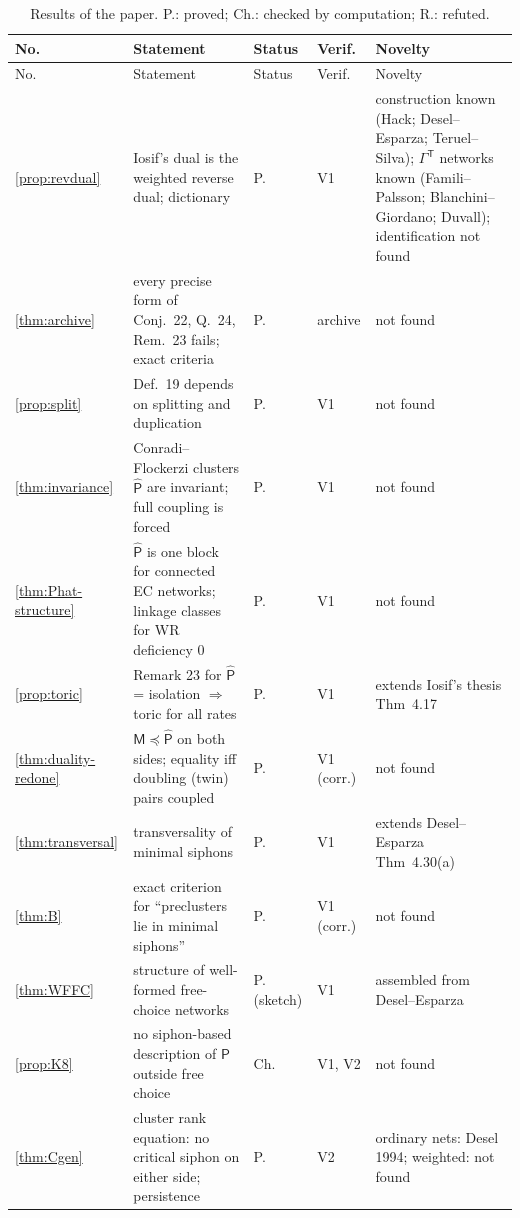 \documentclass[11pt,a4paper]{report}
\newcommand{\Pre}{\mathsf{P}}
\newcommand{\Ph}{\widehat{\mathsf{P}}}
\newcommand{\Mips}{\mathsf{M}}
\newcommand{\refi}{\preceq}
\newcommand{\tp}{^{\mathsf T}}
\begin{document}
{\small
\def\LTcaptype{table}
\setlength{\LTpre}{4pt}
\begin{longtable}{>{\raggedright\arraybackslash}p{0.8cm}>{\raggedright\arraybackslash}p{5.85cm}>{\raggedright\arraybackslash}p{1.6cm}>{\raggedright\arraybackslash}p{1.2cm}>{\raggedright\arraybackslash}p{2.9cm}}
\caption{Results of the paper. P.: proved; Ch.: checked by computation; R.: refuted.}\label{tab:results}\\
\hline
No. & Statement & Status & Verif. & Novelty \\
\hline
\endfirsthead
\hline
No. & Statement & Status & Verif. & Novelty \\
\hline
\endhead
\ref{prop:revdual} & Iosif's dual is the weighted reverse dual; dictionary & P. & V1 & construction known (Hack; Desel--Esparza; Teruel--Silva); \(\Gamma\tp\) networks known (Famili--Palsson; Blanchini--Giordano; Duvall); identification not found \\
\ref{thm:archive} & every precise form of Conj.~22, Q.~24, Rem.~23 fails; exact criteria & P. & archive & not found \\
\ref{prop:split} & Def.~19 depends on splitting and duplication & P. & V1 & not found \\
\ref{thm:invariance} & Conradi--Flockerzi clusters \(\Ph\) are invariant; full coupling is forced & P. & V1 & not found \\
\ref{thm:Phat-structure} & \(\Ph\) is one block for connected EC networks; linkage classes for WR deficiency 0 & P. & V1 & not found \\
\ref{prop:toric} & Remark 23 for \(\Ph\) = isolation \(\Rightarrow\) toric for all rates & P. & V1 & extends Iosif's thesis Thm~4.17 \\
\ref{thm:duality-redone} & \(\Mips\refi\Ph\) on both sides; equality iff doubling (twin) pairs coupled & P. & V1 (corr.) & not found \\
\ref{thm:transversal} & transversality of minimal siphons & P. & V1 & extends Desel--Esparza Thm~4.30(a) \\
\ref{thm:B} & exact criterion for ``preclusters lie in minimal siphons'' & P. & V1 (corr.) & not found \\
\ref{thm:WFFC} & structure of well-formed free-choice networks & P. (sketch) & V1 & assembled from Desel--Esparza \\
\ref{prop:K8} & no siphon-based description of \(\Pre\) outside free choice & Ch. & V1, V2 & not found \\
\ref{thm:Cgen} & cluster rank equation: no critical siphon on either side; persistence & P. & V2 & ordinary nets: Desel 1994; weighted: not found \\

\end{longtable}}
\end{document}
